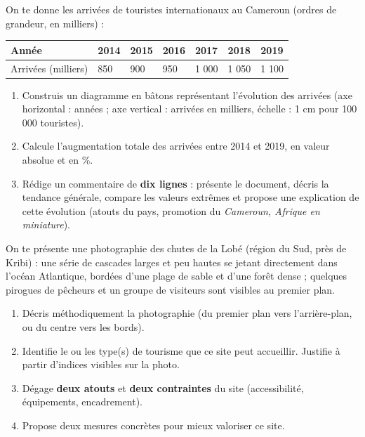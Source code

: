 \documentclass[11pt]{article}
\begin{document}
\begin{exercice}
On te donne les arrivées de touristes internationaux au Cameroun (ordres de grandeur, en milliers) :

\begin{center}
\begin{tabularx}{\linewidth}{|l|X|X|X|X|X|X|}\hline
\rowcolor{popblueL} \textbf{Année} & 2014 & 2015 & 2016 & 2017 & 2018 & 2019 \\ \hline
Arrivées (milliers) & 850 & 900 & 950 & 1 000 & 1 050 & 1 100 \\ \hline
\end{tabularx}
\end{center}

\begin{enumerate}
\item Construis un diagramme en bâtons représentant l'évolution des arrivées (axe horizontal : années ; axe vertical : arrivées en milliers, échelle : 1 cm pour 100 000 touristes).
\item Calcule l'augmentation totale des arrivées entre 2014 et 2019, en valeur absolue et en \%.
\item Rédige un commentaire de \textbf{dix lignes} : présente le document, décris la tendance générale, compare les valeurs extrêmes et propose une explication de cette évolution (atouts du pays, promotion du \emph{Cameroun, Afrique en miniature}).
\end{enumerate}
\end{exercice}

\begin{exercice}
On te présente une photographie des chutes de la Lobé (région du Sud, près de Kribi) : une série de cascades larges et peu hautes se jetant directement dans l'océan Atlantique, bordées d'une plage de sable et d'une forêt dense ; quelques pirogues de pêcheurs et un groupe de visiteurs sont visibles au premier plan.

\begin{enumerate}
\item Décris méthodiquement la photographie (du premier plan vers l'arrière-plan, ou du centre vers les bords).
\item Identifie le ou les type(s) de tourisme que ce site peut accueillir. Justifie à partir d'indices visibles sur la photo.
\item Dégage \textbf{deux atouts} et \textbf{deux contraintes} du site (accessibilité, équipements, encadrement).
\item Propose deux mesures concrètes pour mieux valoriser ce site.
\end{enumerate}
\end{exercice}
\end{document}
